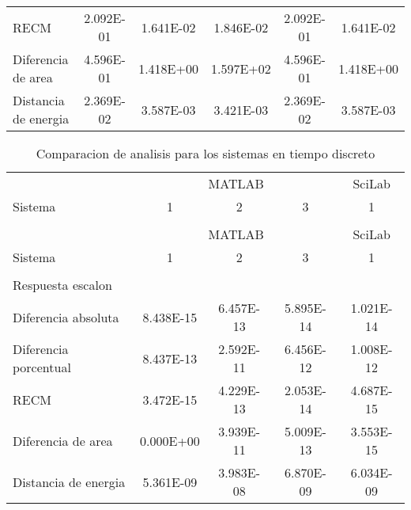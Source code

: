 {\begin{longtable}{l @{\extracolsep{\fill}} ccccc}
            RECM                         & \num{2.092E-01} & \num{1.641E-02} & \num{1.846E-02} & \num{2.092E-01} & \num{1.641E-02}  \\
            Diferencia de area           & \num{4.596E-01} & \num{1.418E+00} & \num{1.597E+02} & \num{4.596E-01} & \num{1.418E+00}  \\
            Distancia de energia         & \num{2.369E-02} & \num{3.587E-03} & \num{3.421E-03} & \num{2.369E-02} & \num{3.587E-03}  \\ \bottomrule
        \end{longtable}}
        
        {\setlength\LTleft{0pt}
        \setlength\LTright{0pt}
        \scriptsize
        \centering
        \renewcommand{\arraystretch}{0.89}
        \begin{longtable}{l @{\extracolsep{\fill}} cccc}
        \caption[Comparacion de analisis - tiempo discreto]{Comparacion de analisis para los sistemas en tiempo discreto} \label{tab:AnalisisStepD} \\
        \toprule
        &    \multicolumn{3}{c}{MATLAB}     & \multicolumn{1}{c}{SciLab} \\ \cmidrule{2-4}\cmidrule{5-5}
        Sistema 					 & 1               &     2      & 3  & 1 \\ 
        & & & &\\
        \endfirsthead
        \toprule
        &    \multicolumn{3}{c}{MATLAB}     & \multicolumn{1}{c}{SciLab} \\ \cmidrule{2-4}\cmidrule{5-5}
        Sistema 					 & 1               &     2      & 3  & 1 \\ 
        & & & &\\
        \endhead
            Respuesta escalon  & & & & \\ \cmidrule{1-1}
            Diferencia absoluta          & \num{8.438E-15} & \num{6.457E-13} & \num{5.895E-14} & \num{1.021E-14}  \\
            Diferencia porcentual        & \num{8.437E-13} & \num{2.592E-11} & \num{6.456E-12} & \num{1.008E-12}  \\
            RECM                         & \num{3.472E-15} & \num{4.229E-13} & \num{2.053E-14} & \num{4.687E-15}  \\
            Diferencia de area           & \num{0.000E+00} & \num{3.939E-11} & \num{5.009E-13} & \num{3.553E-15}  \\
            Distancia de energia         & \num{5.361E-09} & \num{3.983E-08} & \num{6.870E-09} & \num{6.034E-09}  \\

\end{longtable}}
